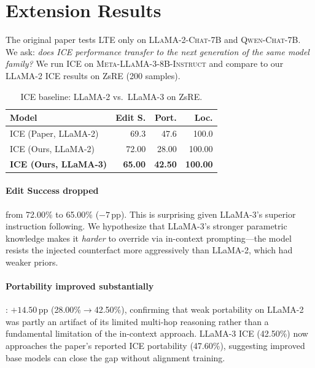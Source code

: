 \documentclass[11pt,a4paper,twocolumn]{article}
\begin{document}
\section{Extension Results}
\label{sec:extension}

The original paper tests LTE only on \textsc{LLaMA-2-Chat-7B} and \textsc{Qwen-Chat-7B}. We ask: \emph{does ICE performance transfer to the next generation of the same model family?} We run ICE on \textsc{Meta-LLaMA-3-8B-Instruct} and compare to our \textsc{LLaMA-2} ICE results on ZsRE (200 samples).

\begin{table}[t]
\centering
\small
\caption{ICE baseline: LLaMA-2 vs.\ LLaMA-3 on ZsRE.}
\label{tab:extension}
\begin{tabular}{lrrr}
\toprule
\textbf{Model} & \textbf{Edit S.} & \textbf{Port.} & \textbf{Loc.} \\
\midrule
ICE (Paper, LLaMA-2) & 69.3 & 47.6 & 100.0 \\
ICE (Ours, LLaMA-2) & 72.00 & 28.00 & 100.00 \\
\textbf{ICE (Ours, LLaMA-3)} & \textbf{65.00} & \textbf{42.50} & \textbf{100.00} \\
\bottomrule
\end{tabular}
\end{table}

\paragraph{Edit Success dropped} from 72.00\% to 65.00\% ($-7$\,pp). This is surprising given LLaMA-3's superior instruction following. We hypothesize that LLaMA-3's stronger parametric knowledge makes it \emph{harder} to override via in-context prompting---the model resists the injected counterfact more aggressively than LLaMA-2, which had weaker priors.

\paragraph{Portability improved substantially}: $+14.50$\,pp (28.00\%$\rightarrow$42.50\%), confirming that weak portability on LLaMA-2 was partly an artifact of its limited multi-hop reasoning rather than a fundamental limitation of the in-context approach. LLaMA-3 ICE (42.50\%) now approaches the paper's reported ICE portability (47.60\%), suggesting improved base models can close the gap without alignment training.
\end{document}
